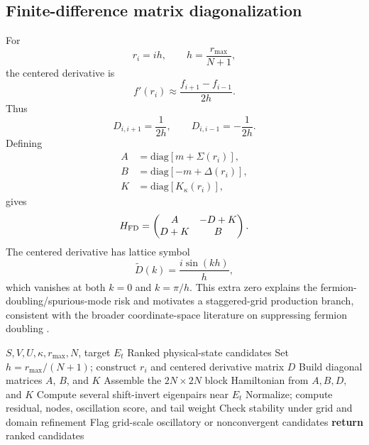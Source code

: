 \documentclass[a4paper,fleqn]{cas-dc}
\begin{document}
\subsection{Finite-difference matrix diagonalization}
For
\begin{equation}
r_i=ih,\qquad h=\frac{r_{\max}}{N+1},
\end{equation}
the centered derivative is
\begin{equation}
f'(r_i)\approx\frac{f_{i+1}-f_{i-1}}{2h}.
\end{equation}
Thus
\begin{equation}
D_{i,i+1}=\frac1{2h},
\qquad
D_{i,i-1}=-\frac1{2h}.
\end{equation}
Defining
\begin{align}
A&=\mathrm{diag}[m+\Sigma(r_i)],\\
B&=\mathrm{diag}[-m+\Delta(r_i)],\\
K&=\mathrm{diag}[K_\kappa(r_i)],
\end{align}
gives
\begin{equation}
H_{\rm FD}=
\begin{pmatrix}
A&-D+K\\
D+K&B
\end{pmatrix}.
\end{equation}
The centered derivative has lattice symbol
\begin{equation}
\tilde D(k)=\frac{i\sin(kh)}{h},
\end{equation}
which vanishes at both $k=0$ and $k=\pi/h$. This extra zero explains the
fermion-doubling/spurious-mode risk and motivates a staggered-grid production
branch, consistent with the broader coordinate-space literature on suppressing
fermion doubling \cite{FillionGourdeau2012,Lewin2010}.


\begin{algorithm}[t]
\caption{Finite-difference eigensolver with spurious-state diagnostics}
\label{alg:fd}
\begin{algorithmic}[1]
\Require $S,V,U,\kappa,r_{\max},N$, target $E_t$
\Ensure Ranked physical-state candidates
\State Set $h=r_{\max}/(N+1)$; construct $r_i$ and centered derivative matrix $D$
\State Build diagonal matrices $A$, $B$, and $K$
\State Assemble the $2N\times2N$ block Hamiltonian from $A,B,D,$ and $K$
\State Compute several shift-invert eigenpairs near $E_t$
\State Normalize; compute residual, nodes, oscillation score, and tail weight
\State Check stability under grid and domain refinement
\EndFor
\State Flag grid-scale oscillatory or nonconvergent candidates
\State \textbf{return} ranked candidates
\end{algorithmic}
\end{algorithm}
\end{document}
